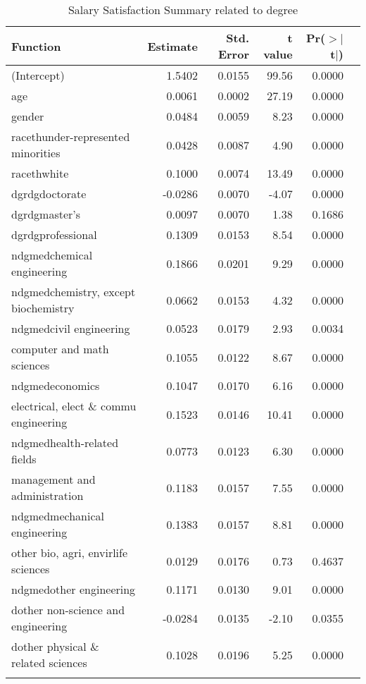 \documentclass[12pt]{article}
\begin{document}
\begin{table}[H]
\centering
\caption{Salary Satisfaction Summary related to degree} 
\label{tab:Salary satisfaction model}
\begin{tabular}{|l|r|r|r|r|r|}
  \toprule
 Function & Estimate & Std. Error & t value & Pr($>$$|$t$|$) \\  \hline
  \midrule
(Intercept) & 1.5402 & 0.0155 & 99.56 & 0.0000 \\  \hline
  age & 0.0061 & 0.0002 & 27.19 & 0.0000 \\  \hline
  gender & 0.0484 & 0.0059 & 8.23 & 0.0000 \\  \hline
  racethunder-represented minorities & 0.0428 & 0.0087 & 4.90 & 0.0000 \\  \hline
  racethwhite & 0.1000 & 0.0074 & 13.49 & 0.0000 \\  \hline
  dgrdgdoctorate & -0.0286 & 0.0070 & -4.07 & 0.0000 \\  \hline
  dgrdgmaster's & 0.0097 & 0.0070 & 1.38 & 0.1686 \\  \hline
  dgrdgprofessional & 0.1309 & 0.0153 & 8.54 & 0.0000 \\  \hline
  ndgmedchemical engineering & 0.1866 & 0.0201 & 9.29 & 0.0000 \\  \hline
  ndgmedchemistry, except biochemistry & 0.0662 & 0.0153 & 4.32 & 0.0000 \\  \hline
  ndgmedcivil engineering & 0.0523 & 0.0179 & 2.93 & 0.0034 \\  \hline
  computer and math sciences & 0.1055 & 0.0122 & 8.67 & 0.0000 \\  \hline
  ndgmedeconomics & 0.1047 & 0.0170 & 6.16 & 0.0000 \\  \hline
  electrical, elect \& commu engineering & 0.1523 & 0.0146 & 10.41 & 0.0000 \\  \hline
  ndgmedhealth-related fields & 0.0773 & 0.0123 & 6.30 & 0.0000 \\ \hline
  management and administration & 0.1183 & 0.0157 & 7.55 & 0.0000 \\ \hline
  ndgmedmechanical engineering & 0.1383 & 0.0157 & 8.81 & 0.0000 \\ \hline
  other bio, agri, envirlife sciences & 0.0129 & 0.0176 & 0.73 & 0.4637 \\ \hline
  ndgmedother engineering & 0.1171 & 0.0130 & 9.01 & 0.0000 \\ \hline
  dother non-science and engineering & -0.0284 & 0.0135 & -2.10 & 0.0355 \\ \hline
  dother physical \& related sciences & 0.1028 & 0.0196 & 5.25 & 0.0000 \\ \hline
$$
\end{tabular}
\end{table}
\end{document}
